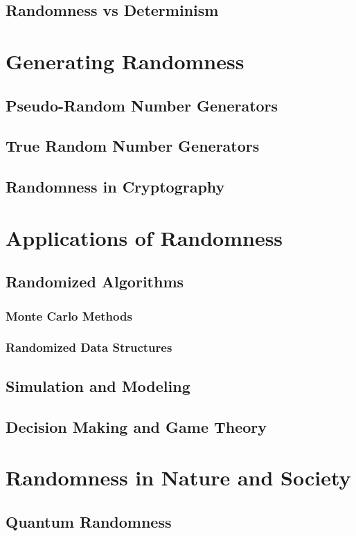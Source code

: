 \documentclass[12pt]{book} %
\begin{document}
\subsection{Randomness vs Determinism}

\section{Generating Randomness}
\subsection{Pseudo-Random Number Generators}
\subsection{True Random Number Generators}
\subsection{Randomness in Cryptography}

\section{Applications of Randomness}
\subsection{Randomized Algorithms}
\subsubsection{Monte Carlo Methods}
\subsubsection{Randomized Data Structures}
\subsection{Simulation and Modeling}
\subsection{Decision Making and Game Theory}

\section{Randomness in Nature and Society}
\subsection{Quantum Randomness}
\end{document}
